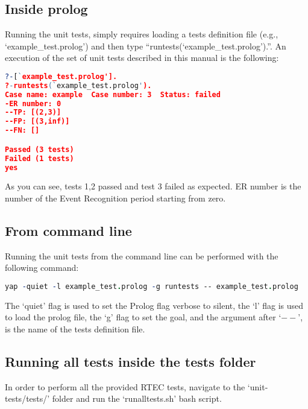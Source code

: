 \documentclass[a4paper,10pt]{article}
\begin{document}
\subsection{Inside prolog}
Running the unit tests, simply requires  loading a tests definition file (e.g., `example\_test.prolog') and then type ``runtests(`example\_test.prolog').''. An execution of the set of unit tests described in this manual is the following:
 \begin{lstlisting}[language=Prolog]
?-[`example_test.prolog'].
?-runtests(`example_test.prolog').
Case name: example	Case number: 3	Status: failed
-ER number: 0
--TP: [(2,3)]
--FP: [(3,inf)]
--FN: []

Passed (3 tests)
Failed (1 tests)
yes
\end{lstlisting}

As you can see, tests 1,2 passed and test 3  failed as expected. ER number is the number of the Event Recognition period starting from zero.
\subsection{From command line}
Running the unit tests from the command line can be performed with the following command:
\begin{lstlisting}[language=Prolog]
  yap -quiet -l example_test.prolog -g runtests -- example_test.prolog
\end{lstlisting}
The `quiet' flag is used to set the Prolog flag verbose to silent, the `l' flag is used to load the prolog file, the `g' flag to set the goal, and the argument after `$--$', is the name of the tests definition file.
\subsection{Running all tests inside the tests folder}
In order to perform all the provided RTEC tests, navigate to the `unit-tests/tests/' folder and run the `runalltests.sh' bash script.
\end{document}
